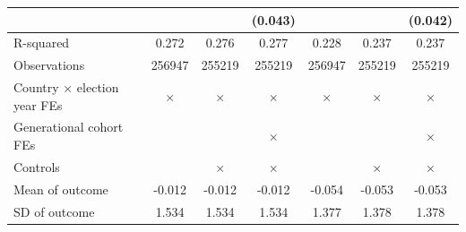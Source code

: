 {\begin{tabular}{l*{6}{c}}
                    &                     &                     &     (0.043)         &                     &                     &     (0.042)         \\
\midrule
R-squared           &       0.272         &       0.276         &       0.277         &       0.228         &       0.237         &       0.237         \\
Observations        &      256947         &      255219         &      255219         &      256947         &      255219         &      255219         \\
Country $\times$ election year FEs&    $\times$         &    $\times$         &    $\times$         &    $\times$         &    $\times$         &    $\times$         \\
Generational cohort FEs&                     &                     &    $\times$         &                     &                     &    $\times$         \\
Controls            &                     &    $\times$         &    $\times$         &                     &    $\times$         &    $\times$         \\
Mean of outcome     &      -0.012         &      -0.012         &      -0.012         &      -0.054         &      -0.053         &      -0.053         \\
SD of outcome       &       1.534         &       1.534         &       1.534         &       1.377         &       1.378         &       1.378         \\
\bottomrule
\end{tabular}
}
